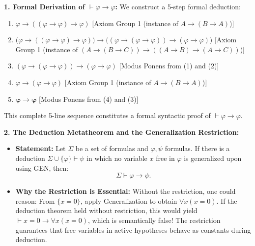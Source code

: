 \begin{solution}
\textbf{1. Formal Derivation of $\vdash \varphi \to \varphi$:}
We construct a 5-step formal deduction:
\begin{enumerate}[leftmargin=1.8em,itemsep=3pt]
  \item[(1)] $\varphi \to ((\varphi \to \varphi) \to \varphi)$ \hfill [Axiom Group 1 (instance of $A \to (B \to A)$)]
  \item[(2)] $\bigl(\varphi \to ((\varphi \to \varphi) \to \varphi)\bigr) \to \bigl((\varphi \to (\varphi \to \varphi)) \to (\varphi \to \varphi)\bigr)$ \hfill [Axiom Group 1 (instance of $(A \to (B \to C)) \to ((A \to B) \to (A \to C))$)]
  \item[(3)] $(\varphi \to (\varphi \to \varphi)) \to (\varphi \to \varphi)$ \hfill [Modus Ponens from (1) and (2)]
  \item[(4)] $\varphi \to (\varphi \to \varphi)$ \hfill [Axiom Group 1 (instance of $A \to (B \to A)$)]
  \item[(5)] $\mathbf{\varphi \to \varphi}$ \hfill [Modus Ponens from (4) and (3)]
\end{enumerate}
This complete 5-line sequence constitutes a formal syntactic proof of $\vdash \varphi \to \varphi$.

\textbf{2. The Deduction Metatheorem and the Generalization Restriction:}
\begin{itemize}[leftmargin=1.4em,itemsep=2pt]
  \item \textbf{Statement:} Let $\Sigma$ be a set of formulas and $\varphi, \psi$ formulas.
  If there is a deduction $\Sigma \cup \{\varphi\} \vdash \psi$ in which no variable $x$ free in $\varphi$ is generalized upon using GEN, then:
  \[
  \Sigma \vdash \varphi \to \psi.
  \]
  \item \textbf{Why the Restriction is Essential:}
  Without the restriction, one could reason:
  From $\{x = 0\}$, apply Generalization to obtain $\forall x (x = 0)$.
  If the deduction theorem held without restriction, this would yield $\vdash x = 0 \to \forall x (x = 0)$, which is semantically false!
  The restriction guarantees that free variables in active hypotheses behave as constants during deduction.
\end{itemize}


\end{solution}
